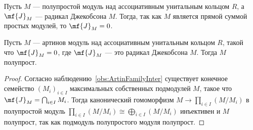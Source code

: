 \documentclass[
	extrafontsizes,
	11pt,
	hyphens,
]{memoir}
\begin{document}
\begin{observation}\label{obs:JacArtin}
Пусть \(M\) --- полупростой модуль над ассоциативным унитальным кольцом \(R\), а \(\mf{J}_M\) --- радикал Джекобсона \(M\). Тогда, так как \(M\) является прямой суммой простых модулей, то \(\mf{J}_M = 0\).
\end{observation}


\begin{theorem}\label{thm:ArtinJac}
Пусть \(M\) --- артинов модуль над ассоциативным унитальным кольцом \(R\), такой что \(\mf{J}_M = 0\), где \(\mf{J}_M\) --- это радикал Джекобсона \(M\).
Тогда \(M\) полупрост.
\end{theorem}

\begin{proof}
Согласно
наблюдению~\ref{obs:ArtinFamilyInter} существует конечное семейство \((M_i)_{i \in I}\) максимальных собственных подмодулей \(M\), такое что \(\mf{J}_M = \bigcap_{i \in I} M_i\).
Тогда канонический гомоморфизм \(M \to \prod_{i \in I} (M / M_i)\) в полупростой модуль \(\prod_{i \in I} (M / M_i) \cong \bigoplus_{i \in I} (M / M_i)\) инъективен и \(M\) полупрост, так как подмодуль полупростого модуля полупрост.
\end{proof}
\end{document}
